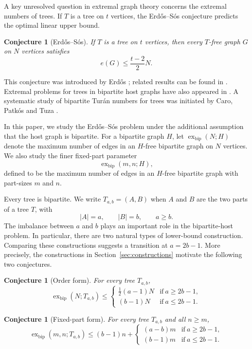 \documentclass[10pt,a4paper]{amsart}
\newtheorem{conjecture}[theorem]{Conjecture}
\newcommand{\exbip}{\operatorname{ex}_{\mathrm{bip}}}
\begin{document}
A key unresolved question in extremal graph theory concerns the extremal numbers of trees. If $T$ is a tree on $t$ vertices, the Erd\H{o}s--S\'os conjecture predicts the optimal linear upper bound.

\begin{conjecture}[Erd\H{o}s--S\'os]
\label{conj:erdos-sos}
If $T$ is a tree on $t$ vertices, then every $T$-free graph $G$ on $N$ vertices satisfies
\[
e(G)\leq \frac{t-2}{2}N.
\]
\end{conjecture}

This conjecture was introduced by Erd\H{o}s \cite{erdos1964extremal}; related results can be found in
\cite{sidorenko2018keyrings,goerlich2016,besomi2021}.
Extremal problems for trees in bipartite host graphs have also appeared in
\cite{erdos1964extremal,kopylov1977,yuan2017,li2021,chen2023,yuan2024}.
A systematic study of bipartite Tur\'an numbers for trees was initiated by Caro, Patk\'os and Tuza \cite{caro2025}.

In this paper, we study the Erd\H{o}s--S\'os problem under the additional assumption that the host graph is bipartite. For a bipartite graph $H$, let $\exbip(N;H)$ denote the maximum number of edges in an $H$-free bipartite graph on $N$ vertices. We also study the finer fixed-part parameter
\[
\exbip(m,n;H),
\]
defined to be the maximum number of edges in an $H$-free bipartite graph with part-sizes $m$ and $n$.

Every tree is bipartite. We write $T_{a,b}=(A,B)$ when $A$ and $B$ are the two parts of a tree $T$, with
\[
|A|=a,\qquad |B|=b,\qquad a\geq b.
\]
The imbalance between $a$ and $b$ plays an important role in the bipartite-host problem. In particular, there are two natural types of lower-bound construction. Comparing these constructions suggests a transition at $a=2b-1$. More precisely, the constructions in Section~\ref{sec:constructions} motivate the following two conjectures.

\begin{conjecture}[Order form]
\label{conj:order}
For every tree $T_{a,b}$,
\[
    \exbip(N;T_{a,b})\le\begin{cases}
        \frac12(a-1)N& \text{if}\ a\geq2b-1,\\
        (b-1)N& \text{if}\ a\leq2b-1.
    \end{cases}
\]
\end{conjecture}

\begin{conjecture}[Fixed-part form]
\label{conj:fixed-parts}
For every tree $T_{a,b}$ and all $n\geq m$,
\[
    \exbip(m,n;T_{a,b})\le(b-1)n+\begin{cases}
    (a-b)m&\text{if}\ a\geq2b-1,\\
    (b-1)m&\text{if}\ a\leq2b-1.
    \end{cases}
\]
\end{conjecture}
\end{document}
